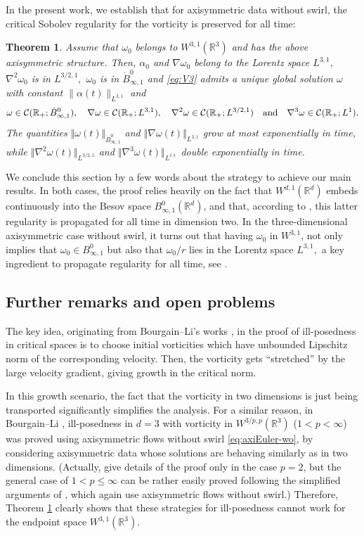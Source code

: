 \documentclass[11pt]{amsart}
\newtheorem{thm}{Theorem}[section]
\newcommand{\R}{{\mathbb R}}
\def\cC{{\mathcal C}}
\numberwithin{equation}{section}
\newcommand{\nrm}[1]{\Vert#1\Vert}
\newcommand{\nb}{\nabla}
\newcommand{\andf}{\quad\hbox{and}\quad}
\newcommand{\omg}{\omega}
\def\bbR{\mathbb{R}}
\begin{document}
	In the present work, we establish that for axisymmetric data without swirl, 
	the critical Sobolev regularity for the vorticity is  preserved for all time:
\begin{thm}\label{thm:axi} Assume that $\omega_0$ belongs to $W^{3,1}(\R^3)$ and 
has the above axisymmetric structure.  
Then,  $\alpha_0$ and $\nabla\omega_0$ belong to the Lorentz space $L^{3,1},$  $\nabla^2\omega_0$ is in $L^{3/2,1},$
$\omega_0$ is in $\dot B^0_{\infty,1}$ and 
\eqref{eq:V3} admits a unique global solution $\omega$ with constant $\|\alpha(t)\|_{L^{3,1}}$ and $$\omega\in\cC(\R_+;\dot B^0_{\infty,1}), \quad
\nabla\omega \in \cC(\R_+;L^{3,1}),\quad
\nabla^2\omega\in \cC(\R_+;L^{3/2,1})\andf \nabla^3\omega\in\cC(\R_+;L^1).$$ 
{The quantities $\nrm{\omg(t)}_{\dot B^0_{\infty,1}}$ and $\nrm{\nb\omg(t)}_{L^{3,1}}$ grow at most exponentially in time, while $\nrm{\nb^2\omg(t)}_{L^{3/2,1}}$ and $\nrm{\nb^3\omg(t)}_{L^1},$ double exponentially in time.}
\end{thm}
We conclude this section by a few words about the strategy to achieve our main results. 
In both cases, the proof relies heavily on the fact that $W^{d,1}(\R^d)$ embeds continuously into the Besov space $B^0_{\infty,1}(
\R^d)$, and that, according to \cite{HK}, this latter regularity is propagated  for all time  in dimension two. 
 In the three-dimensional axisymmetric case without swirl,  it turns out that having 
  $\omega_0$  in $W^{3,1}$, not only implies that $\omega_0\in  B^0_{\infty,1}$
  but also that  $\omega_0/r$ lies in the Lorentz space $L^{3,1},$
  a key ingredient to propagate regularity for all time, see \cite{AHK,D}. 
  
  
\subsection{Further remarks and open problems} The key idea, originating from Bourgain--Li's works \cite{BL1,BL2,BL3}, in the proof of ill-posedness in critical spaces is to choose initial vorticities which have unbounded Lipschitz norm of the corresponding velocity. Then, the vorticity gets ``stretched'' by the large velocity gradient, giving growth in the critical norm. 

In this growth scenario, the fact that the vorticity in two dimensions is just being transported significantly simplifies the analysis. For a similar reason, in Bourgain--Li \cite{BL3}, ill-posedness in $d = 3$ with vorticity in $W^{3/p,p}(\R^3)$ ($1<p<\infty$) was proved using axisymmetric flows without swirl \eqref{eq:axiEuler-wo}, by considering axisymmetric data whose solutions are behaving similarly as in two dimensions. (Actually, \cite{BL3} give details of the proof only in the case $p = 2$, but the general case of $1<p\le \infty$ can be rather easily proved following the simplified arguments of \cite{EJ1,JK,JK2}, which again use axisymmetric flows without swirl.) Therefore, Theorem \ref{thm:axi} clearly shows that these strategies for ill-posedness cannot work for the endpoint space $W^{3,1}(\bbR^{3})$.
\end{document}
